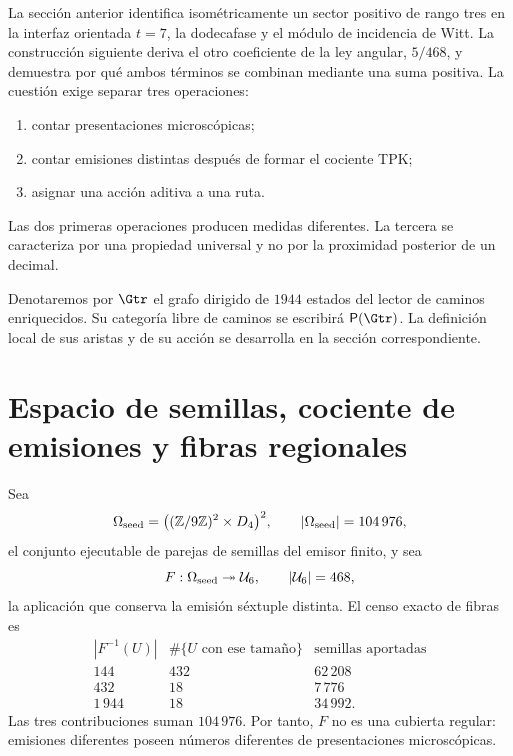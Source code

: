 \label{p3-20260826:chap:medida-accion-positiva}

La sección anterior identifica isométricamente un sector positivo de rango tres en
la interfaz orientada \(t=7\), la dodecafase y el módulo de incidencia de Witt. La construcción
siguiente deriva el otro coeficiente de la ley angular, \(5/468\), y
demuestra por qué ambos términos se combinan mediante una suma positiva. La
cuestión exige separar
tres operaciones:
\begin{enumerate}
  \item contar presentaciones microscópicas;
  \item contar emisiones distintas después de formar el cociente TPK;
  \item asignar una acción aditiva a una ruta.
\end{enumerate}
Las dos primeras operaciones producen medidas diferentes. La tercera se
caracteriza por una propiedad universal y no por la proximidad posterior de
un decimal.

Denotaremos por \(\Gtr\) el grafo dirigido de \(1944\) estados del lector de
caminos enriquecidos. Su categoría libre de caminos se escribirá
\(\mathsf P(\Gtr)\). La definición local de sus aristas y de su acción se
desarrolla en la sección correspondiente.

\section{Espacio de semillas, cociente de emisiones y fibras regionales}

Sea
\[
 \Omega_{\rm seed}
 =\bigl((\mathbb Z/9\mathbb Z)^2\times D_4\bigr)^2,
 \qquad
 |\Omega_{\rm seed}|=104\,976,
\]
el conjunto ejecutable de parejas de semillas del emisor finito, y sea
\[
 F:\Omega_{\rm seed}\twoheadrightarrow\mathcal U_6,
 \qquad
 |\mathcal U_6|=468,
\]
la aplicación que conserva la emisión séxtuple distinta. El censo exacto de
fibras es
\[
\begin{array}{c|c|c}
|F^{-1}(U)|&\#\{U\text{ con ese tamaño}\}&\text{semillas aportadas}\\
\hline
144&432&62\,208\\
432&18&7\,776\\
1\,944&18&34\,992.
\end{array}
\]
Las tres contribuciones suman \(104\,976\). Por tanto, \(F\) no es una
cubierta regular: emisiones diferentes poseen números diferentes de
presentaciones microscópicas.

